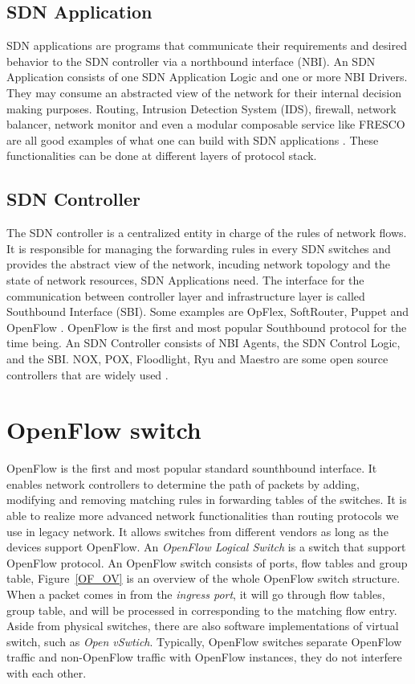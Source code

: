 \subsection{SDN Application}
\label{SDN Application}
SDN applications are programs that communicate their requirements and desired behavior to the SDN controller via a northbound interface (NBI). An SDN Application consists of one SDN Application Logic and one or more NBI Drivers. They may consume an abstracted view of the network for their internal decision making purposes. Routing, Intrusion Detection System (IDS), firewall, network balancer, network monitor and even a modular composable service like FRESCO are all good examples of what one can build with SDN applications \cite{FRESCO}. These functionalities can be done at different layers of protocol stack.

\subsection{SDN Controller}
\label{SDN Controller}
The SDN controller is a centralized entity in charge of the rules of network flows. It is responsible for managing the forwarding rules in every SDN switches and provides the abstract view of the network, incuding network topology and the state of network resources, SDN Applications need. The interface for the communication between controller layer and infrastructure layer is called Southbound Interface (SBI). Some examples are OpFlex, SoftRouter, Puppet and OpenFlow \cite{LNRSW04}. OpenFlow is the first and most popular Southbound protocol for the time being. An SDN Controller consists of NBI Agents, the SDN Control Logic, and the SBI. NOX, POX, Floodlight, Ryu and Maestro are some open source controllers that are widely used \cite{GKPPCMS08,EZA11}.

\section{OpenFlow switch}
\label{OpenFlow switch}
OpenFlow is the first and most popular standard sounthbound interface. It enables network controllers to determine the path of packets by adding, modifying and removing matching rules in forwarding tables of the switches. It is able to realize more advanced network functionalities than routing protocols we use in legacy network. It allows switches from different vendors as long as the devices support OpenFlow. An \textit{OpenFlow Logical Switch} is a switch that support OpenFlow protocol. An OpenFlow switch consists of ports, flow tables and group table, Figure~\ref{OF_OV} is an overview of the whole OpenFlow switch structure. When a packet comes in from the \textit{ingress port}, it will go through flow tables, group table, and will be processed in corresponding to the matching flow entry. Aside from physical switches, there are also software implementations of virtual switch, such as \textit{Open vSwtich}. Typically, OpenFlow switches separate OpenFlow traffic and non-OpenFlow traffic with OpenFlow instances, they do not interfere with each other. \cite{HP_SPEC}

